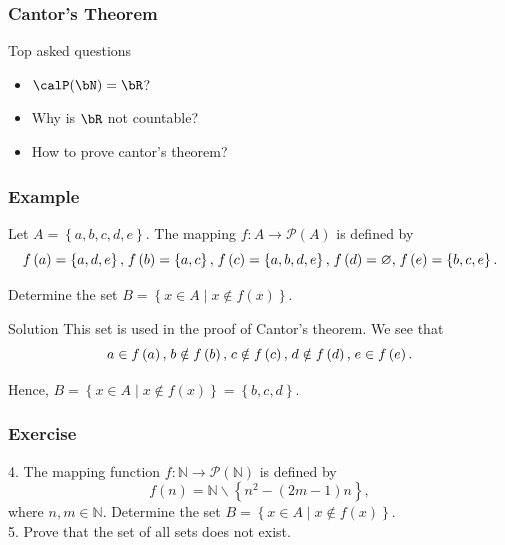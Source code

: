 \documentclass{beamer}
\begin{document}
\begin{frame}
    \frametitle{Cantor's Theorem}
    \vs{2em}
    \begin{block}{Top asked questions}
        \begin{itemize}
            \item $\calP(\bN) = \bR$? 
            \item Why is $\bR$ not countable? 
            \item How to prove cantor's theorem? 
        \end{itemize}
    \end{block}
\end{frame}
\begin{frame}
    \frametitle{Example}
    \hh Let $A = \left\{ {a,b,c,d,e} \right\}$. The mapping $f:A \to \mathcal{P}\left( A \right)$ is defined by
    \begin{equation*}
        {f\left( a \right) = \left\{ {a,d,e} \right\},\;}\kern0pt{f\left( b \right) = \left\{ {a,c} \right\},\;}\kern0pt{f\left( c \right) = \left\{ {a,b,d,e} \right\},\;}\kern0pt{f\left( d \right) = \varnothing,\;}\kern0pt{f\left( e \right) = \left\{ {b,c,e} \right\}.}
    \end{equation*}
    \par Determine the set $B = \left\{ {x \in A \mid x \not\in f\left( x \right)} \right\}.$
    \vv
    \begin{block}{Solution}
        This set is used in the proof of Cantor’s theorem. We see that
        \begin{equation*}
            {a \in f\left( a \right),\;}\kern0pt{b \notin f\left( b \right),\;}\kern0pt{c \notin f\left( c \right),\;}\kern0pt{d \notin f\left( d \right),\;}\kern0pt{e \in f\left( e \right).}
        \end{equation*}
    \par Hence, ${B = \left\{ {x \in A \mid x \notin f\left( x \right)} \right\} }={ \left\{ {b,c,d} \right\}.}$
    \end{block}
\end{frame}
\begin{frame}
    \frametitle{Exercise}
    4. The mapping function $f:\mathbb{N} \to \mathcal{P}\left( \mathbb{N} \right)$ is defined by 
    \begin{equation*}
        f\left( n \right) = \mathbb{N}\backslash \left\{ {{n^2} - \left( {2m - 1} \right)n} \right\},
    \end{equation*}
    where $n,m \in \mathbb{N}$. Determine the set $B = \left\{ {x \in A \mid x \not\in f\left( x \right)} \right\}.$
    \vs{4em}\\
    5. Prove that the set of all sets does not exist.
\end{frame}
\end{document}
